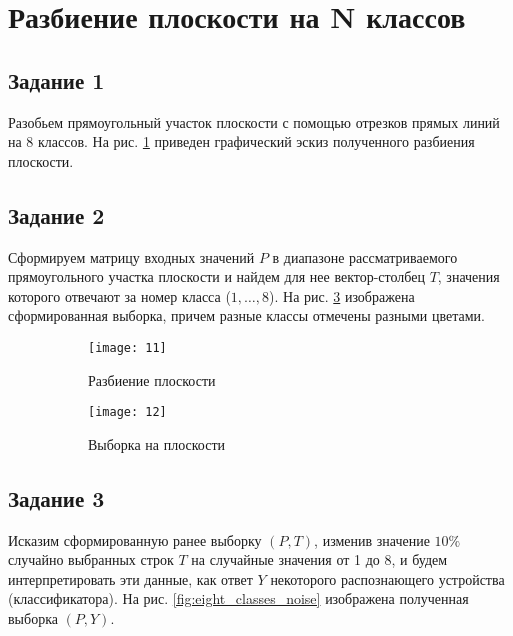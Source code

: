 \newpage

\section{Разбиение плоскости на N классов}

\subsection{Задание 1}

Разобьем прямоугольный участок плоскости с помощью отрезков прямых линий на 8 классов. На рис. \ref{fig:eight_classes_plane_splitting} приведен графический эскиз полученного разбиения плоскости.

\subsection{Задание 2}

Сформируем матрицу входных значений $P$ в диапазоне рассматриваемого прямоугольного участка плоскости и найдем для нее вектор-столбец $T$, значения которого отвечают за номер класса ($1,\dotsc ,8$). На рис. \ref{fig:eight_classes_sample} изображена сформированная выборка, причем разные классы отмечены разными цветами.

\begin{figure}[H]
\begin{center}
	\begin{subfigure}[b]{0.49\textwidth}
		\texttt{[image: 11]}
		\caption{Разбиение плоскости}
		\label{fig:eight_classes_plane_splitting}
	\end{subfigure}
	\begin{subfigure}[b]{0.49\textwidth}
		\texttt{[image: 12]}
		\caption{Выборка на плоскости}
		\label{fig:eight_classes_sample}
	\end{subfigure}
	\caption{}
\end{center}
\end{figure}
\vspace{-1.5cm}

\subsection{Задание 3}

Исказим сформированную ранее выборку $(P, T)$, изменив значение $10\%$ случайно выбранных строк $T$ на случайные значения от 1 до 8, и будем интерпретировать эти данные, как ответ $Y$ некоторого распознающего устройства (классификатора). На рис. \ref{fig:eight_classes_noise} изображена полученная выборка $(P, Y)$.

